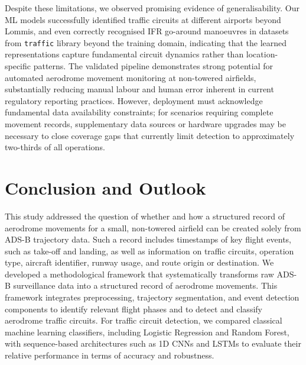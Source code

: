 \documentclass[
  manuscript=proceedings,  %
  layout=preprint,         %
  year=2025,
  volume=x,
]{extra/joas}
\begin{document}
Despite these limitations, we observed promising evidence of generalisability. Our ML models successfully identified traffic circuits at different airports beyond Lommis, and even correctly recognised IFR go-around manoeuvres in datasets from \texttt{traffic} library beyond the training domain, indicating that the learned representations capture fundamental circuit dynamics rather than location-specific patterns. The validated pipeline demonstrates strong potential for automated aerodrome movement monitoring at non-towered airfields, substantially reducing manual labour and human error inherent in current regulatory reporting practices. However, deployment must acknowledge fundamental data availability constraints; for scenarios requiring complete movement records, supplementary data sources or hardware upgrades may be necessary to close coverage gaps that currently limit detection to approximately two-thirds of all operations.

\section{Conclusion and Outlook}
\label{sec:conclusion}
This study addressed the question of whether and how a structured record of aerodrome movements for a small, non-towered airfield can be created solely from ADS-B trajectory data. Such a record includes timestamps of key flight events, such as take-off and landing, as well as information on traffic circuits, operation type, aircraft identifier, runway usage, and route origin or destination. We developed a methodological framework that systematically transforms raw ADS-B surveillance data into a structured record of aerodrome movements. This framework integrates preprocessing, trajectory segmentation, and event detection components to identify relevant flight phases and to detect and classify aerodrome traffic circuits. For traffic circuit detection, we compared classical machine learning classifiers, including Logistic Regression and Random Forest, with sequence-based architectures such as 1D CNNs and LSTMs to evaluate their relative performance in terms of accuracy and robustness.
\end{document}
